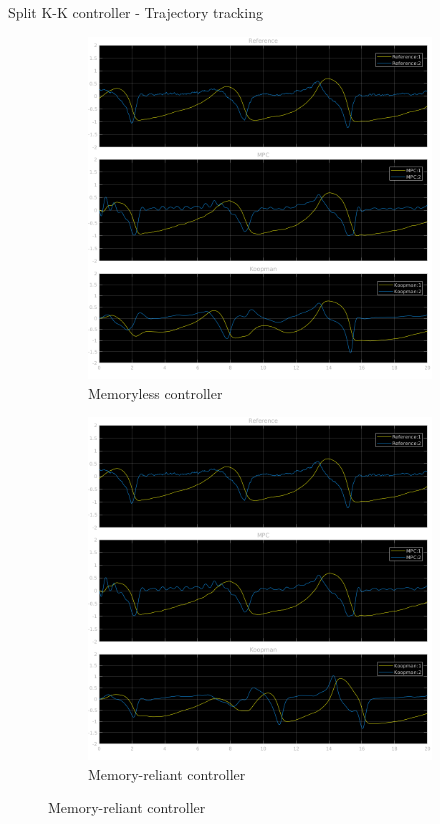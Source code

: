 \documentclass{beamer}
\begin{document}
\begin{frame}{Split K-K controller - Trajectory tracking}
    \begin{figure}
        \centering
        \begin{subfigure}[b]{0.45\textwidth}
            \centering
            \includegraphics[width=\textwidth]{Undelayed_Split_Ref.png}
            \caption{Memoryless controller}
        \end{subfigure}
        \hfill
        \begin{subfigure}[b]{0.45\textwidth}
            \centering
            \includegraphics[width=\textwidth]{Delayed_Split_Ref.png}
            \caption{Memory-reliant controller}
        \end{subfigure}
    \end{figure}
\end{frame}
\end{document}
